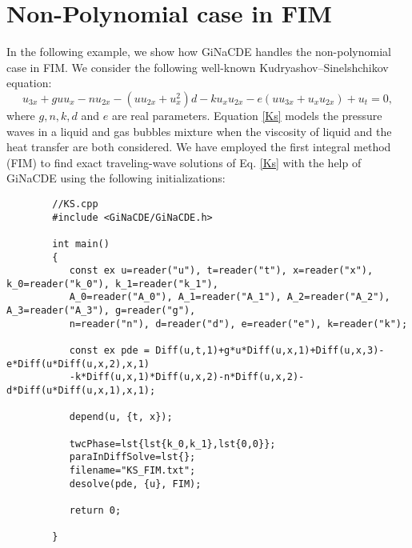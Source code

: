 \documentclass[prd,aps,floats,showkeys,nofootinbib,notitlepage]{revtex4-2}
\begin{document}
	\section{Non-Polynomial case in FIM}
	In the following example, we show how GiNaCDE handles the non-polynomial case in FIM. We consider the following well-known Kudryashov–Sinelshchikov equation: %
	\begin{equation}\label{Ks}
		{u_{3x}} + gu{u_x} - n{u_{2x}} - \left( {u{u_{2x}} + u_x^2} \right)d - k{u_x}{u_{2x}} - e\left( {u{u_{3x}} + {u_x}{u_{2x}}} \right) + {u_t}=0,
	\end{equation}
	where $g,n,k,d$ and $e$ are real parameters. Equation \eqref{Ks} models the pressure waves in a liquid and gas bubbles mixture when the viscosity of liquid and the heat transfer are both considered. We have employed the first integral method (FIM) to find exact traveling-wave solutions of Eq. \eqref{Ks} with the help of GiNaCDE using the following initializations:
	\begin{verbatim}
		//KS.cpp
		#include <GiNaCDE/GiNaCDE.h>
				
		int main()
		{
		   const ex u=reader("u"), t=reader("t"), x=reader("x"), k_0=reader("k_0"), k_1=reader("k_1"), 
		   A_0=reader("A_0"), A_1=reader("A_1"), A_2=reader("A_2"), A_3=reader("A_3"), g=reader("g"), 
		   n=reader("n"), d=reader("d"), e=reader("e"), k=reader("k");
		
		   const ex pde = Diff(u,t,1)+g*u*Diff(u,x,1)+Diff(u,x,3)-e*Diff(u*Diff(u,x,2),x,1)
		   -k*Diff(u,x,1)*Diff(u,x,2)-n*Diff(u,x,2)-d*Diff(u*Diff(u,x,1),x,1);
		
		   depend(u, {t, x});
		
		   twcPhase=lst{lst{k_0,k_1},lst{0,0}};
		   paraInDiffSolve=lst{};
		   filename="KS_FIM.txt";
		   desolve(pde, {u}, FIM);
		
		   return 0;
			
		}
	
	\end{verbatim}
	
\end{document}
